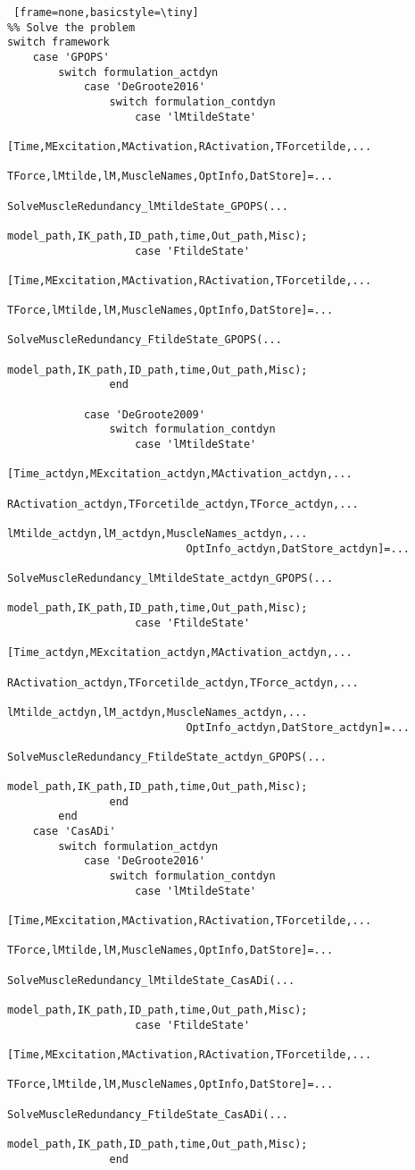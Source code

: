 \documentclass[a4paper,oneside,11pt]{article}
\begin{document}
\begin{lstlisting} [frame=none,basicstyle=\tiny]
%% Solve the problem
switch framework
    case 'GPOPS'
        switch formulation_actdyn
            case 'DeGroote2016'     
                switch formulation_contdyn
                    case 'lMtildeState'
                        [Time,MExcitation,MActivation,RActivation,TForcetilde,...
                            TForce,lMtilde,lM,MuscleNames,OptInfo,DatStore]=...
                            SolveMuscleRedundancy_lMtildeState_GPOPS(...
                            model_path,IK_path,ID_path,time,Out_path,Misc);
                    case 'FtildeState'   
                        [Time,MExcitation,MActivation,RActivation,TForcetilde,...
                            TForce,lMtilde,lM,MuscleNames,OptInfo,DatStore]=...
                            SolveMuscleRedundancy_FtildeState_GPOPS(...
                            model_path,IK_path,ID_path,time,Out_path,Misc);
                end

            case 'DeGroote2009' 
                switch formulation_contdyn
                    case 'lMtildeState'
                        [Time_actdyn,MExcitation_actdyn,MActivation_actdyn,...
                            RActivation_actdyn,TForcetilde_actdyn,TForce_actdyn,...
                            lMtilde_actdyn,lM_actdyn,MuscleNames_actdyn,...
                            OptInfo_actdyn,DatStore_actdyn]=...
                            SolveMuscleRedundancy_lMtildeState_actdyn_GPOPS(...
                            model_path,IK_path,ID_path,time,Out_path,Misc);
                    case 'FtildeState'   
                        [Time_actdyn,MExcitation_actdyn,MActivation_actdyn,...
                            RActivation_actdyn,TForcetilde_actdyn,TForce_actdyn,...
                            lMtilde_actdyn,lM_actdyn,MuscleNames_actdyn,...
                            OptInfo_actdyn,DatStore_actdyn]=...
                            SolveMuscleRedundancy_FtildeState_actdyn_GPOPS(...
                            model_path,IK_path,ID_path,time,Out_path,Misc);
                end
        end
    case 'CasADi'
        switch formulation_actdyn
            case 'DeGroote2016'      
                switch formulation_contdyn
                    case 'lMtildeState'
                        [Time,MExcitation,MActivation,RActivation,TForcetilde,...
                            TForce,lMtilde,lM,MuscleNames,OptInfo,DatStore]=...
                            SolveMuscleRedundancy_lMtildeState_CasADi(...
                            model_path,IK_path,ID_path,time,Out_path,Misc);
                    case 'FtildeState'   
                        [Time,MExcitation,MActivation,RActivation,TForcetilde,...
                            TForce,lMtilde,lM,MuscleNames,OptInfo,DatStore]=...
                            SolveMuscleRedundancy_FtildeState_CasADi(...
                            model_path,IK_path,ID_path,time,Out_path,Misc);
                end


\end{lstlisting}
\end{document}
